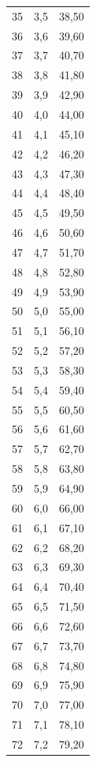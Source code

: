 \documentclass{article}
\begin{document}
\begin{longtable}{|r|r|r|}
        35 & 3,5 & 38,50 \\ 
        36 & 3,6 & 39,60 \\ 
        37 & 3,7 & 40,70 \\ 
        38 & 3,8 & 41,80 \\ 
        39 & 3,9 & 42,90 \\ 
        40 & 4,0 & 44,00 \\ 
        41 & 4,1 & 45,10 \\ 
        42 & 4,2 & 46,20 \\ 
        43 & 4,3 & 47,30 \\ 
        44 & 4,4 & 48,40 \\ 
        45 & 4,5 & 49,50 \\ 
        46 & 4,6 & 50,60 \\ 
        47 & 4,7 & 51,70 \\ 
        48 & 4,8 & 52,80 \\ 
        49 & 4,9 & 53,90 \\ 
        50 & 5,0 & 55,00 \\ 
        51 & 5,1 & 56,10 \\ 
        52 & 5,2 & 57,20 \\ 
        53 & 5,3 & 58,30 \\ 
        54 & 5,4 & 59,40 \\ 
        55 & 5,5 & 60,50 \\ 
        56 & 5,6 & 61,60 \\ 
        57 & 5,7 & 62,70 \\ 
        58 & 5,8 & 63,80 \\ 
        59 & 5,9 & 64,90 \\ 
        60 & 6,0 & 66,00 \\ 
        61 & 6,1 & 67,10 \\ 
        62 & 6,2 & 68,20 \\ 
        63 & 6,3 & 69,30 \\ 
        64 & 6,4 & 70,40 \\ 
        65 & 6,5 & 71,50 \\ 
        66 & 6,6 & 72,60 \\ 
        67 & 6,7 & 73,70 \\ 
        68 & 6,8 & 74,80 \\ 
        69 & 6,9 & 75,90 \\ 
        70 & 7,0 & 77,00 \\ 
        71 & 7,1 & 78,10 \\ 
        72 & 7,2 & 79,20 \\ 

\end{longtable}
\end{document}

